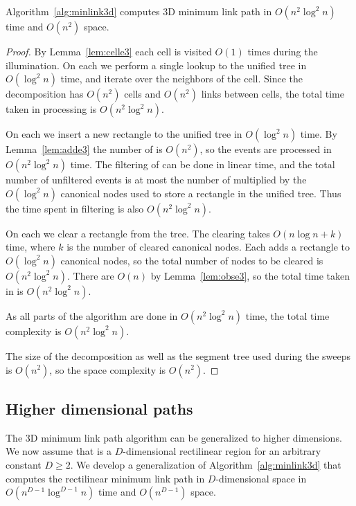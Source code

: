 \documentclass[english,gradu]{tktltiki2018}
\begin{document}
\begin{theo}Algorithm~\ref{alg:minlink3d} computes 3D minimum link path in $O(n^2\log^2n)$ time and $O(n^2)$ space.\end{theo}
\begin{proof}
By Lemma~\ref{lem:celle3} each cell is visited $O(1)$ times during the illumination.
On each \cellE we perform a single lookup to the unified tree in $O(\log^2 n)$ time, and iterate over the neighbors of the cell.
Since the decomposition has $O(n^2)$ cells and $O(n^2)$ links between cells, the total time taken in processing \cellEs is $O(n^2\log^2 n)$.

On each \addE we insert a new rectangle to the unified tree in $O(\log^2 n)$ time.
By Lemma~\ref{lem:adde3} the number of \addEs is $O(n^2)$, so the events are processed in $O(n^2\log^2 n)$ time.
The filtering of \addEs can be done in linear time, and the total number of unfiltered events is at most the number of \addEs multiplied by the $O(\log^2 n)$ canonical nodes used to store a rectangle in the unified tree.
Thus the time spent in filtering is also $O(n^2\log^2 n)$.

On each \obsE we clear a rectangle from the tree.
The clearing takes $O(n\log n + k)$ time, where $k$ is the number of cleared canonical nodes.
Each \addE adds a rectangle to $O(\log^2 n)$ canonical nodes, so the total number of nodes to be cleared is $O(n^2\log^2 n)$.
There are $O(n)$ \obsEs by Lemma~\ref{lem:obse3}, so the total time taken in \obsEs is $O(n^2\log^2 n)$.

As all parts of the algorithm are done in $O(n^2\log^2 n)$ time, the total time complexity is $O(n^2\log^2 n)$.

The size of the decomposition as well as the segment tree used during the sweeps is $O(n^2)$, so the space complexity is $O(n^2)$.
\end{proof}

\subsection{Higher dimensional paths}

The 3D minimum link path algorithm can be generalized to higher dimensions.
We now assume that \fspace is a $D$-dimensional rectilinear region for an arbitrary constant $D\ge 2$.
We develop a generalization of Algorithm~\ref{alg:minlink3d} that computes the rectilinear minimum link path in $D$-dimensional space in $O(n^{D-1}\log^{D-1}n)$ time and $O(n^{D-1})$ space.
\end{document}
